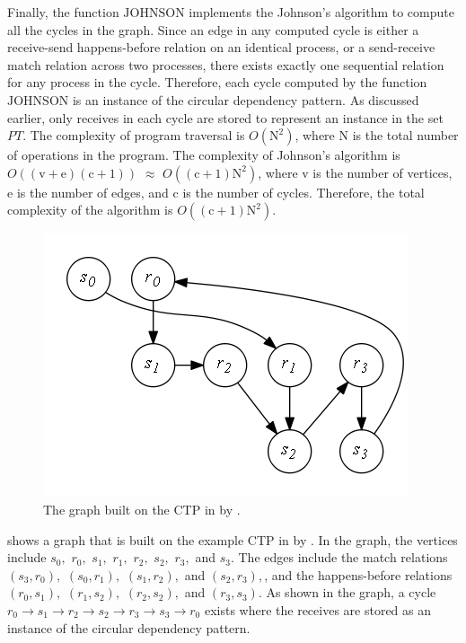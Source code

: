 Finally, the function $\mathrm{JOHNSON}$ implements the Johnson's algorithm to compute all the cycles in the graph. Since an edge in any computed cycle is either a receive-send happens-before relation on an identical process, or a send-receive match relation across two processes, there exists exactly one sequential relation for any process in the cycle. Therefore, each cycle computed by the function $\mathrm{JOHNSON}$ is an instance of the circular dependency pattern. As discussed earlier, only receives in each cycle are stored to represent an instance in the set $\mathit{PT}$. The complexity of program traversal is $O(\mathrm{N}^2)$, where $\mathrm{N}$ is the total number of operations in the program. The complexity of Johnson's algorithm is $O((\mathrm{v}+\mathrm{e})(\mathrm{c}+1))$ $\approx$ $O((\mathrm{c}+1)\mathrm{N}^2)$, where $\mathrm{v}$ is the number of vertices, $\mathrm{e}$ is the number of edges, and $\mathrm{c}$ is the number of cycles. Therefore, the total complexity of the algorithm is $O((\mathrm{c}+1)\mathrm{N}^2)$.

\begin{figure}[h]
\centering
\includegraphics[scale=0.45]{fig/circulardependencyGraph1.png}
\caption{The graph built on the CTP in  by .}
\label{fig:circulargraph}
\end{figure}

 shows a graph that is built on the example CTP in  by . 
In the graph, the vertices include $s_0,$ $r_0,$ $s_1,$ $r_1,$ $r_2,$ $s_2,$ $r_3,$ and $s_3$. The edges include the match relations $(s_3,r_0),$ $(s_0,r_1),$ $(s_1,r_2),$ and $(s_2,r_3),$, and the happens-before relations $(r_0,s_1),$ $(r_1,s_2),$ $(r_2,s_2),$ and $(r_3,s_3)$. 
As shown in the graph, a cycle $r_0\rightarrow s_1\rightarrow r_2\rightarrow s_2\rightarrow r_3\rightarrow s_3\rightarrow r_0$ exists where the receives are stored as an instance of the circular dependency pattern.

